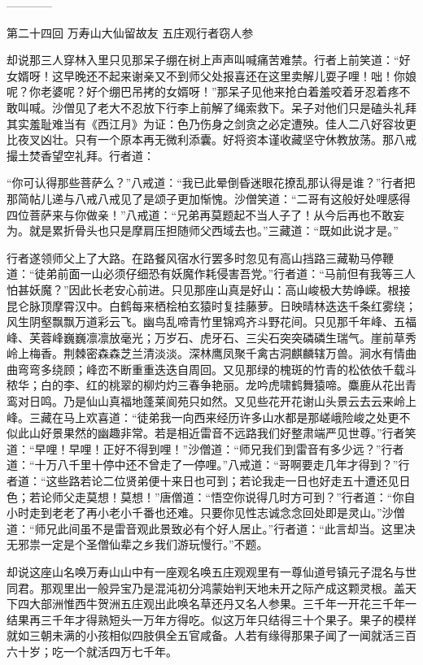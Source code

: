 \documentclass[12pt,UTF8]{ctexbook}
\begin{document}
------------

第二十四回 万寿山大仙留故友 五庄观行者窃人参

却说那三人穿林入里只见那呆子绷在树上声声叫喊痛苦难禁。行者上前笑道：“好女婿呀！这早晚还不起来谢亲又不到师父处报喜还在这里卖解儿耍子哩！咄！你娘呢？你老婆呢？好个绷巴吊拷的女婿呀！”那呆子见他来抢白着羞咬着牙忍着疼不敢叫喊。沙僧见了老大不忍放下行李上前解了绳索救下。呆子对他们只是磕头礼拜其实羞耻难当有《西江月》为证：色乃伤身之剑贪之必定遭殃。佳人二八好容妆更比夜叉凶壮。只有一个原本再无微利添囊。好将资本谨收藏坚守休教放荡。那八戒撮土焚香望空礼拜。行者道：

“你可认得那些菩萨么？”八戒道：“我已此晕倒昏迷眼花撩乱那认得是谁？”行者把那简帖儿递与八戒八戒见了是颂子更加惭愧。沙僧笑道：“二哥有这般好处哩感得四位菩萨来与你做亲！”八戒道：“兄弟再莫题起不当人子了！从今后再也不敢妄为。就是累折骨头也只是摩肩压担随师父西域去也。”三藏道：“既如此说才是。”

行者遂领师父上了大路。在路餐风宿水行罢多时忽见有高山挡路三藏勒马停鞭道：“徒弟前面一山必须仔细恐有妖魔作耗侵害吾党。”行者道：“马前但有我等三人怕甚妖魔？”因此长老安心前进。只见那座山真是好山：高山峻极大势峥嵘。根接昆仑脉顶摩霄汉中。白鹤每来栖桧柏玄猿时复挂藤萝。日映晴林迭迭千条红雾绕；风生阴壑飘飘万道彩云飞。幽鸟乱啼青竹里锦鸡齐斗野花间。只见那千年峰、五福峰、芙蓉峰巍巍凛凛放毫光；万岁石、虎牙石、三尖石突突磷磷生瑞气。崖前草秀岭上梅香。荆棘密森森芝兰清淡淡。深林鹰凤聚千禽古洞麒麟辖万兽。涧水有情曲曲弯弯多绕顾；峰峦不断重重迭迭自周回。又见那绿的槐斑的竹青的松依依千载斗秾华；白的李、红的桃翠的柳灼灼三春争艳丽。龙吟虎啸鹤舞猿啼。麋鹿从花出青鸾对日鸣。乃是仙山真福地蓬莱阆苑只如然。又见些花开花谢山头景云去云来岭上峰。三藏在马上欢喜道：“徒弟我一向西来经历许多山水都是那嵯峨险峻之处更不似此山好景果然的幽趣非常。若是相近雷音不远路我们好整肃端严见世尊。”行者笑道：“早哩！早哩！正好不得到哩！”沙僧道：“师兄我们到雷音有多少远？”行者道：“十万八千里十停中还不曾走了一停哩。”八戒道：“哥啊要走几年才得到？”行者道：“这些路若论二位贤弟便十来日也可到；若论我走一日也好走五十遭还见日色；若论师父走莫想！莫想！”唐僧道：“悟空你说得几时方可到？”行者道：“你自小时走到老老了再小老小千番也还难。只要你见性志诚念念回处即是灵山。”沙僧道：“师兄此间虽不是雷音观此景致必有个好人居止。”行者道：“此言却当。这里决无邪祟一定是个圣僧仙辈之乡我们游玩慢行。”不题。

却说这座山名唤万寿山山中有一座观名唤五庄观观里有一尊仙道号镇元子混名与世同君。那观里出一般异宝乃是混沌初分鸿蒙始判天地未开之际产成这颗灵根。盖天下四大部洲惟西牛贺洲五庄观出此唤名草还丹又名人参果。三千年一开花三千年一结果再三千年才得熟短头一万年方得吃。似这万年只结得三十个果子。果子的模样就如三朝未满的小孩相似四肢俱全五官咸备。人若有缘得那果子闻了一闻就活三百六十岁；吃一个就活四万七千年。
\end{document}
